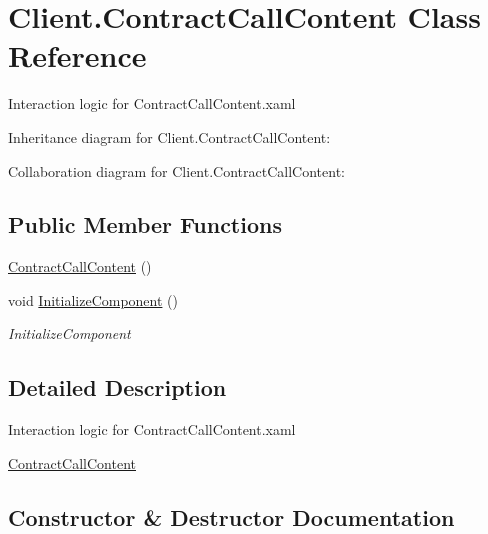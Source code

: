 \hypertarget{class_client_1_1_contract_call_content}{}\section{Client.\+Contract\+Call\+Content Class Reference}
\label{class_client_1_1_contract_call_content}


Interaction logic for Contract\+Call\+Content.\+xaml  




Inheritance diagram for Client.\+Contract\+Call\+Content\+:


Collaboration diagram for Client.\+Contract\+Call\+Content\+:
\subsection*{Public Member Functions}
\begin{DoxyCompactItemize}
\item 
\hyperlink{class_client_1_1_contract_call_content_a926d64eeda9118372e46bc8b085ef7ef}{Contract\+Call\+Content} ()
\item 
void \hyperlink{class_client_1_1_contract_call_content_aa232b31c78e95c3cb42a0a1c9f11e4e4}{Initialize\+Component} ()
\begin{DoxyCompactList}\small\item\em Initialize\+Component \end{DoxyCompactList}\end{DoxyCompactItemize}


\subsection{Detailed Description}
Interaction logic for Contract\+Call\+Content.\+xaml 

\hyperlink{class_client_1_1_contract_call_content}{Contract\+Call\+Content} 

\subsection{Constructor \& Destructor Documentation}
\mbox{\label{class_client_1_1_contract_call_content_a926d64eeda9118372e46bc8b085ef7ef}} 

